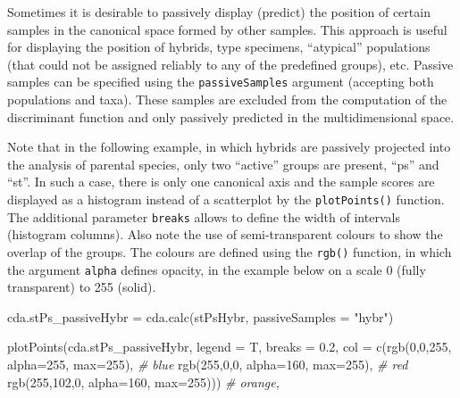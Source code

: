 \documentclass[
  11pt,
  a4paper]{article}
\newenvironment{Shaded}{\begin{snugshade}}{\end{snugshade}}
\newcommand{\AttributeTok}[1]{\textcolor[rgb]{0.77,0.63,0.00}{#1}}
\newcommand{\CommentTok}[1]{\textcolor[rgb]{0.56,0.35,0.01}{\textit{#1}}}
\newcommand{\DecValTok}[1]{\textcolor[rgb]{0.00,0.00,0.81}{#1}}
\newcommand{\FloatTok}[1]{\textcolor[rgb]{0.00,0.00,0.81}{#1}}
\newcommand{\FunctionTok}[1]{\textcolor[rgb]{0.00,0.00,0.00}{#1}}
\newcommand{\NormalTok}[1]{#1}
\newcommand{\OtherTok}[1]{\textcolor[rgb]{0.56,0.35,0.01}{#1}}
\newcommand{\StringTok}[1]{\textcolor[rgb]{0.31,0.60,0.02}{#1}}
\begin{document}
Sometimes it is desirable to passively display (predict) the position of
certain samples in the canonical space formed by other samples. This
approach is useful for displaying the position of hybrids, type
specimens, ``atypical'' populations (that could not be assigned reliably
to any of the predefined groups), etc. Passive samples can be specified
using the \texttt{passiveSamples} argument (accepting both populations
and taxa). These samples are excluded from the computation of the
discriminant function and only passively predicted in the
multidimensional space.

Note that in the following example, in which hybrids are passively
projected into the analysis of parental species, only two ``active''
groups are present, ``ps'' and ``st''. In such a case, there is only one
canonical axis and the sample scores are displayed as a histogram
instead of a scatterplot by the \texttt{plotPoints()} function. The
additional parameter \texttt{breaks} allows to define the width of
intervals (histogram columns). Also note the use of semi-transparent
colours to show the overlap of the groups. The colours are defined using
the \texttt{rgb()} function, in which the argument \texttt{alpha}
defines opacity, in the example below on a scale 0 (fully transparent)
to 255 (solid).

\begin{Shaded}
\begin{Highlighting}[]

\NormalTok{cda.stPs\_passiveHybr }\OtherTok{=} \FunctionTok{cda.calc}\NormalTok{(stPsHybr, }\AttributeTok{passiveSamples =} \StringTok{"hybr"}\NormalTok{)}

\FunctionTok{plotPoints}\NormalTok{(cda.stPs\_passiveHybr, }\AttributeTok{legend =}\NormalTok{ T, }\AttributeTok{breaks =} \FloatTok{0.2}\NormalTok{,}
                \AttributeTok{col =} \FunctionTok{c}\NormalTok{(}\FunctionTok{rgb}\NormalTok{(}\DecValTok{0}\NormalTok{,}\DecValTok{0}\NormalTok{,}\DecValTok{255}\NormalTok{, }\AttributeTok{alpha=}\DecValTok{255}\NormalTok{, }\AttributeTok{max=}\DecValTok{255}\NormalTok{), }\CommentTok{\# blue}
                        \FunctionTok{rgb}\NormalTok{(}\DecValTok{255}\NormalTok{,}\DecValTok{0}\NormalTok{,}\DecValTok{0}\NormalTok{, }\AttributeTok{alpha=}\DecValTok{160}\NormalTok{, }\AttributeTok{max=}\DecValTok{255}\NormalTok{), }\CommentTok{\# red}
                        \FunctionTok{rgb}\NormalTok{(}\DecValTok{255}\NormalTok{,}\DecValTok{102}\NormalTok{,}\DecValTok{0}\NormalTok{, }\AttributeTok{alpha=}\DecValTok{160}\NormalTok{, }\AttributeTok{max=}\DecValTok{255}\NormalTok{))) }\CommentTok{\# orange, }
\end{Highlighting}
\end{Shaded}
\end{document}
